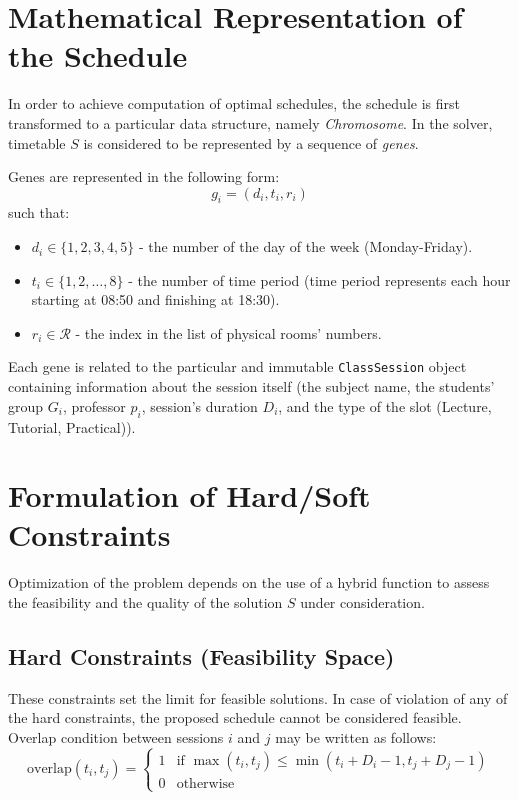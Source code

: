 \section{Mathematical Representation of the Schedule}

In order to achieve computation of optimal schedules, the schedule is first transformed to a particular data structure, namely \textit{Chromosome}. In the solver, timetable $S$ is considered to be represented by a sequence of \textit{genes}.

Genes are represented in the following form:
\begin{equation}
    g_i = (d_i, t_i, r_i)
\end{equation}
such that:
\begin{itemize}
    \item $d_i \in \{1, 2, 3, 4, 5\}$ - the number of the day of the week (Monday-Friday).
    \item $t_i \in \{1, 2, \dots, 8\}$ - the number of time period (time period represents each hour starting at 08:50 and finishing at 18:30).
    \item $r_i \in \mathcal{R}$ - the index in the list of physical rooms' numbers.
\end{itemize}

Each gene is related to the particular and immutable \texttt{ClassSession} object containing information about the session itself (the subject name, the students' group $G_i$, professor $p_i$, session's duration $D_i$, and the type of the slot (Lecture, Tutorial, Practical)).



\section{Formulation of Hard/Soft Constraints}

Optimization of the problem depends on the use of a hybrid function to assess the feasibility and the quality of the solution $S$ under consideration.

\subsection{Hard Constraints (Feasibility Space)}

These constraints set the limit for feasible solutions. In case of violation of any of the hard constraints, the proposed schedule cannot be considered feasible. Overlap condition between sessions $i$ and $j$ may be written as follows:
\begin{equation}
    \text{overlap}(t_i, t_j) = \begin{cases} 
      1 & \text{if } \max(t_i, t_j) \le \min(t_i + D_i - 1, t_j + D_j - 1) \\
      0 & \text{otherwise}
   \end{cases}
\end{equation}

